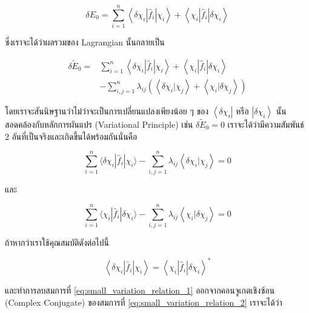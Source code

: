 \begin{equation}
  \delta E_0
  =
  \sum_{i=1}^n
  \left\langle
  \delta \chi_i\left|\hat{f}_i\right| \chi_i
  \right\rangle
  +
  \left\langle
  \chi_i\left|\hat{f}_i\right| \delta \chi_i
  \right\rangle
\end{equation}

\noindent ซึ่งเราจะได้ว่าผลรวมของ Lagrangian นั้นกลายเป็น

\begin{equation}
  \begin{aligned}
    \delta \tilde{E}_0
    = & \sum_{i=1}^n\left\langle\delta \chi_i\left|\hat{f}_i\right| \chi_i\right\rangle
    +\left\langle\chi_i\left|\hat{f}_i\right| \delta \chi_i\right\rangle                    \\
      & -\sum_{i, j=1}^n \lambda_{i j}\left(\left\langle\delta \chi_i | \chi_j\right\rangle
    + \left\langle\chi_i | \delta \chi_j\right\rangle\right)
  \end{aligned}
\end{equation}

\noindent โดยเราจะสันนิษฐานว่าไม่ว่าจะเป็นการเปลี่ยนแปลงเพียงน้อย ๆ ของ $\left\langle\delta \chi_i\right|$ หรือ
$\left|\delta \chi_i\right\rangle$ นั้นสอดคล้องกับหลักการผันแปร (Variational Principle) เช่น $\delta \tilde{E}_0=0$
เราจะได้ว่ามีความสัมพันธ์ 2 อันที่เป็นจริงและเกิดขึ้นได้พร้อมกันนั่นคือ

\begin{equation}
  \label{eq:small_variation_relation_1}
  \sum_{i=1}^n \langle\delta \chi_i | \hat{f}_i | \chi_i \rangle
  - \sum_{i, j=1}^n \lambda_{i j}\left\langle\delta \chi_i | \chi_j\right\rangle
  = 0
\end{equation}

\noindent และ

\begin{equation}
  \label{eq:small_variation_relation_2}
  \sum_{i=1}^n \langle\chi_i | \hat{f}_i | \delta \chi_i \rangle
  - \sum_{i, j=1}^n \lambda_{i j}\left\langle\chi_i | \delta \chi_j\right\rangle
  = 0
\end{equation}

ถ้าหากว่าเราใช้คุณสมบัติดังต่อไปนี้

\begin{equation}
  \left\langle\delta \chi_i\left|\hat{f}_i\right| \chi_i\right\rangle
  =
  \left\langle\chi_i\left|\hat{f}_i\right| \delta \chi_i\right\rangle^*
\end{equation}

\noindent และทำการลบสมการที่ \eqref{eq:small_variation_relation_1} ออกจากคอนจูเกตเชิงซ้อน (Complex Conjugate) ของสมการที่
\eqref{eq:small_variation_relation_2} เราจะได้ว่า

